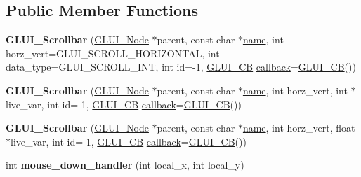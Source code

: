 \subsection*{Public Member Functions}
\begin{DoxyCompactItemize}
\item 
\hypertarget{classGLUI__Scrollbar_a1f8f2b7e425d2efa36bc9a78f9e34517}{{\bfseries G\-L\-U\-I\-\_\-\-Scrollbar} (\hyperlink{classGLUI__Node}{G\-L\-U\-I\-\_\-\-Node} $\ast$parent, const char $\ast$\hyperlink{classGLUI__Control_aa95b97d50df45335fc33f0af03958eb3}{name}, int horz\-\_\-vert=G\-L\-U\-I\-\_\-\-S\-C\-R\-O\-L\-L\-\_\-\-H\-O\-R\-I\-Z\-O\-N\-T\-A\-L, int data\-\_\-type=G\-L\-U\-I\-\_\-\-S\-C\-R\-O\-L\-L\-\_\-\-I\-N\-T, int id=-\/1, \hyperlink{classGLUI__CB}{G\-L\-U\-I\-\_\-\-C\-B} \hyperlink{classGLUI__Control_a96060fe0cc6d537e736dd6eef78e24ab}{callback}=\hyperlink{classGLUI__CB}{G\-L\-U\-I\-\_\-\-C\-B}())}\label{classGLUI__Scrollbar_a1f8f2b7e425d2efa36bc9a78f9e34517}

\item 
\hypertarget{classGLUI__Scrollbar_a47d9ed74340f7379ca0791540a78e883}{{\bfseries G\-L\-U\-I\-\_\-\-Scrollbar} (\hyperlink{classGLUI__Node}{G\-L\-U\-I\-\_\-\-Node} $\ast$parent, const char $\ast$\hyperlink{classGLUI__Control_aa95b97d50df45335fc33f0af03958eb3}{name}, int horz\-\_\-vert, int $\ast$live\-\_\-var, int id=-\/1, \hyperlink{classGLUI__CB}{G\-L\-U\-I\-\_\-\-C\-B} \hyperlink{classGLUI__Control_a96060fe0cc6d537e736dd6eef78e24ab}{callback}=\hyperlink{classGLUI__CB}{G\-L\-U\-I\-\_\-\-C\-B}())}\label{classGLUI__Scrollbar_a47d9ed74340f7379ca0791540a78e883}

\item 
\hypertarget{classGLUI__Scrollbar_a018e83611007c0a0465cc8817cc29b9f}{{\bfseries G\-L\-U\-I\-\_\-\-Scrollbar} (\hyperlink{classGLUI__Node}{G\-L\-U\-I\-\_\-\-Node} $\ast$parent, const char $\ast$\hyperlink{classGLUI__Control_aa95b97d50df45335fc33f0af03958eb3}{name}, int horz\-\_\-vert, float $\ast$live\-\_\-var, int id=-\/1, \hyperlink{classGLUI__CB}{G\-L\-U\-I\-\_\-\-C\-B} \hyperlink{classGLUI__Control_a96060fe0cc6d537e736dd6eef78e24ab}{callback}=\hyperlink{classGLUI__CB}{G\-L\-U\-I\-\_\-\-C\-B}())}\label{classGLUI__Scrollbar_a018e83611007c0a0465cc8817cc29b9f}

\item 
\hypertarget{classGLUI__Scrollbar_a8a964670e5d2366454321ffc2875d3c5}{int {\bfseries mouse\-\_\-down\-\_\-handler} (int local\-\_\-x, int local\-\_\-y)}\label{classGLUI__Scrollbar_a8a964670e5d2366454321ffc2875d3c5}


\end{DoxyCompactItemize}
